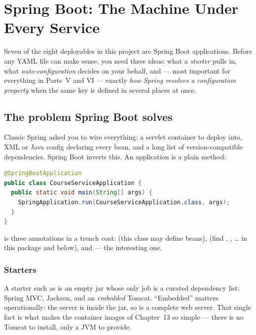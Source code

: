 \chapter{Spring Boot: The Machine Under Every Service}
\label{ch:springboot}

Seven of the eight deployables in this project are Spring Boot
applications. Before any YAML file can make sense, you need three ideas:
what a \emph{starter} pulls in, what \emph{auto-configuration} decides on
your behalf, and --- most important for everything in Parts~V and VI ---
exactly \emph{how Spring resolves a configuration property} when the same
key is defined in several places at once.

\section{The problem Spring Boot solves}

Classic Spring asked you to wire everything: a servlet container to deploy
into, XML or Java config declaring every bean, and a long list of
version-compatible dependencies. Spring Boot inverts this.
An application is a plain  method:

\begin{lstlisting}[language=Java]
@SpringBootApplication
public class CourseServiceApplication {
  public static void main(String[] args) {
    SpringApplication.run(CourseServiceApplication.class, args);
  }
}
\end{lstlisting}

 is three annotations in a trench coat:
 (this class may define beans),
 (find , ,
\ldots{} in this package and below), and 
--- the interesting one.

\subsection{Starters}

A starter such as  is an empty jar whose
only job is a curated dependency list: Spring MVC, Jackson, and an
\emph{embedded} Tomcat. ``Embedded'' matters operationally: the server is
inside the jar, so  is a complete web
server. That single fact is what makes the container images of
Chapter~13 so simple --- there is no Tomcat to install, only a JVM to
provide.

